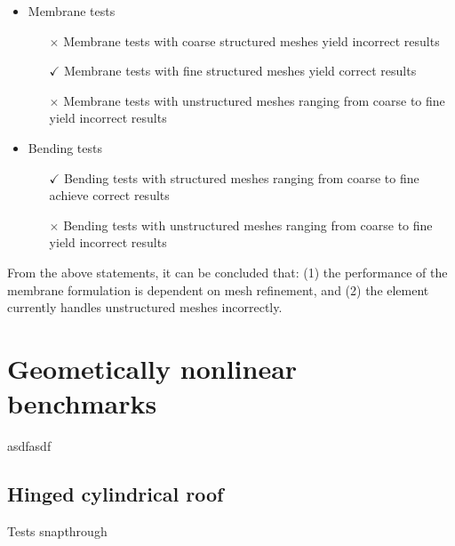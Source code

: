 \begin{itemize}
	\item Membrane tests
	\begin{itemize}
		\item[{$\times$}] Membrane tests with coarse structured meshes yield incorrect results
		\item[{$\checkmark$}] Membrane tests with fine structured meshes yield correct results
		\item[{$\times$}] Membrane tests with unstructured meshes ranging from coarse to fine yield incorrect results
	\end{itemize}
	
	\item Bending tests
	\begin{itemize}
		\item[{$\checkmark$}] Bending tests with structured meshes ranging from coarse to fine achieve correct results
		\item[{$\times$}] Bending tests with unstructured meshes ranging from coarse to fine yield incorrect results
	\end{itemize}	
\end{itemize}

From the above statements, it can be concluded that: (1) the performance of the membrane formulation is dependent on mesh refinement, and (2) the element currently handles unstructured meshes incorrectly.













\section{Geometically nonlinear benchmarks}

asdfasdf

\subsection{Hinged cylindrical roof}

Tests snapthrough

